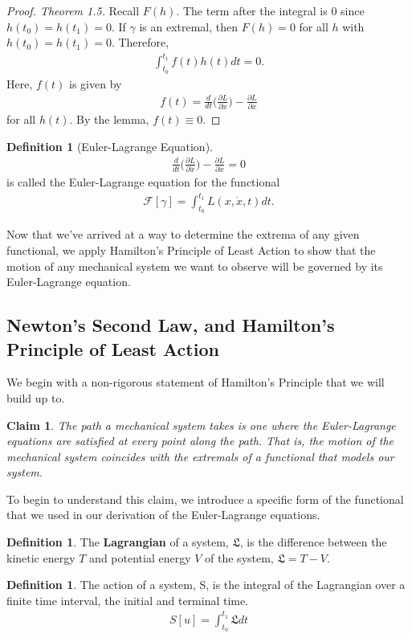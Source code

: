 \documentclass[10pt, psamsfonts]{amsart}
\newtheorem{claim}[thm]{Claim}
\theoremstyle{definition}
\newtheorem{defn}[thm]{Definition}
\theoremstyle{remark}
\numberwithin{equation}{section}
\begin{document}
\begin{proof}[Proof. Theorem 1.5]
Recall $F(h)$. The term after the integral is 0 since $h(t_0) = h(t_1) = 0$. If $\gamma$ is an extremal, then $F(h) = 0$ for all $h$ with $h(t_0) = h(t_1) = 0$. Therefore,
\begin{align*}
  \int_{t_0}^{t_1} f(t)h(t)dt = 0.
\end{align*}
Here, $f(t)$ is given by
\begin{align*}
  f(t) = \frac{d}{dt} \bigg(\frac{\partial L}{\partial \dot{x}}  \bigg) - \frac{\partial L}{\partial x} 
\end{align*}
for all $h(t)$. By the lemma, $f(t) \equiv 0$.
\end{proof}

\begin{defn}[Euler-Lagrange Equation]
\begin{align*}
  \frac{d}{dt} \bigg(\frac{\partial L}{\partial \dot{x}}  \bigg) - \frac{\partial L}{\partial x} = 0 
\end{align*}
is called the Euler-Lagrange equation for the functional 
\begin{align*}
    \mathcal{F}[\gamma] = \int_{t_0}^{t_1}L(x, \dot{x}, t)dt.
\end{align*}
\end{defn}

Now that we've arrived at a way to determine the extrema of any given functional, we apply Hamilton's Principle of Least Action to show that the motion of any mechanical system we want to observe will be governed by its Euler-Lagrange equation.

\subsection{Newton's Second Law, and Hamilton's Principle of Least Action}
We begin with a non-rigorous statement of Hamilton's Principle that we will build up to.
\begin{claim}
The path a mechanical system takes is one where the Euler-Lagrange equations are satisfied at every point along the path. That is, the motion of the mechanical system coincides with the extremals of a functional that models our system.
\end{claim}

\noindent To begin to understand this claim, we introduce a specific form of the functional that we used in our derivation of the Euler-Lagrange equations.

\begin{defn}
The \textbf{Lagrangian} of a system, $\mathfrak{L}$, is the difference between the kinetic energy $T$ and potential energy $V$ of the system, $\mathfrak{L} = T - V$.
\end{defn}
\begin{defn}
The action of a system, S, is the integral of the Lagrangian over a finite time interval, the initial and terminal time.
\begin{align*}
  S[u] = \int_{t_0}^{t_1} \mathfrak{L}dt  
\end{align*}
\end{defn}
\end{document}
